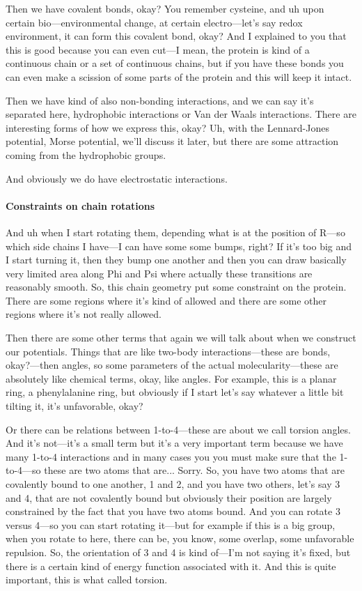 Then we have covalent bonds, okay? You remember cysteine, and uh upon certain bio—environmental change, at certain electro—let's say redox environment, it can form this covalent bond, okay? And I explained to you that this is good because you can even cut—I mean, the protein is kind of a continuous chain or a set of continuous chains, but if you have these bonds you can even make a scission of some parts of the protein and this will keep it intact.

Then we have kind of also non-bonding interactions, and we can say it's separated here, hydrophobic interactions or Van der Waals interactions. There are interesting forms of how we express this, okay? Uh, with the Lennard-Jones potential, Morse potential, we'll discuss it later, but there are some attraction coming from the hydrophobic groups.

And obviously we do have electrostatic interactions.

\paragraph{Constraints on chain rotations}
And uh when I start rotating them, depending what is at the position of R—so which side chains I have—I can have some some bumps, right? If it's too big and I start turning it, then they bump one another and then you can draw basically very limited area along Phi and Psi where actually these transitions are reasonably smooth. So, this chain geometry put some constraint on the protein. There are some regions where it's kind of allowed and there are some other regions where it's not really allowed.

Then there are some other terms that again we will talk about when we construct our potentials. Things that are like two-body interactions—these are bonds, okay?—then angles, so some parameters of the actual molecularity—these are absolutely like chemical terms, okay, like angles. For example, this is a planar ring, a phenylalanine ring, but obviously if I start let's say whatever a little bit tilting it, it's unfavorable, okay?

Or there can be relations between 1-to-4—these are about we call torsion angles. And it's not—it's a small term but it's a very important term because we have many 1-to-4 interactions and in many cases you you must make sure that the 1-to-4—so these are two atoms that are... Sorry. So, you have two atoms that are covalently bound to one another, 1 and 2, and you have two others, let’s say 3 and 4, that are not covalently bound but obviously their position are largely constrained by the fact that you have two atoms bound. And you can rotate 3 versus 4—so you can start rotating it—but for example if this is a big group, when you rotate to here, there can be, you know, some overlap, some unfavorable repulsion. So, the orientation of 3 and 4 is kind of—I’m not saying it's fixed, but there is a certain kind of energy function associated with it. And this is quite important, this is what called torsion.

